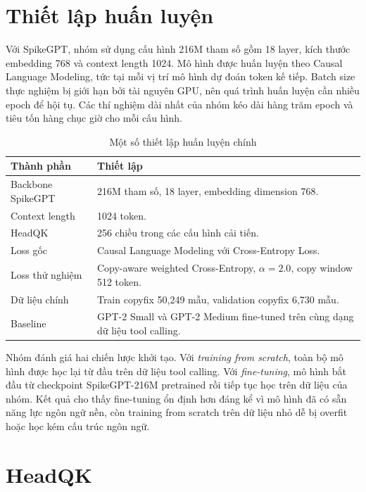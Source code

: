 \documentclass[12pt,a4paper,oneside]{report}
\newlength{\manualparindent}
\newcommand{\manualindent}{\hspace*{\manualparindent}}
\begin{document}
\section{Thiết lập huấn luyện}

\manualindent%
Với SpikeGPT, nhóm sử dụng cấu hình 216M tham số gồm 18 layer, kích thước embedding 768 và context length 1024. Mô hình được huấn luyện theo Causal Language Modeling, tức tại mỗi vị trí mô hình dự đoán token kế tiếp. Batch size thực nghiệm bị giới hạn bởi tài nguyên GPU, nên quá trình huấn luyện cần nhiều epoch để hội tụ. Các thí nghiệm dài nhất của nhóm kéo dài hàng trăm epoch và tiêu tốn hàng chục giờ cho mỗi cấu hình.

\begin{table}[H]
\centering
\caption{Một số thiết lập huấn luyện chính}
\begin{tabularx}{\textwidth}{p{4cm}X}
\toprule
\textbf{Thành phần} & \textbf{Thiết lập} \\
\midrule
Backbone SpikeGPT & 216M tham số, 18 layer, embedding dimension 768. \\
Context length & 1024 token. \\
HeadQK & 256 chiều trong các cấu hình cải tiến. \\
Loss gốc & Causal Language Modeling với Cross-Entropy Loss. \\
Loss thử nghiệm & Copy-aware weighted Cross-Entropy, \(\alpha=2.0\), copy window 512 token. \\
Dữ liệu chính & Train copyfix 50,249 mẫu, validation copyfix 6,730 mẫu. \\
Baseline & GPT-2 Small và GPT-2 Medium fine-tuned trên cùng dạng dữ liệu tool calling. \\
\bottomrule
\end{tabularx}
\end{table}

\manualindent%
Nhóm đánh giá hai chiến lược khởi tạo. Với \textit{training from scratch}, toàn bộ mô hình được học lại từ đầu trên dữ liệu tool calling. Với \textit{fine-tuning}, mô hình bắt đầu từ checkpoint SpikeGPT-216M pretrained rồi tiếp tục học trên dữ liệu của nhóm. Kết quả cho thấy fine-tuning ổn định hơn đáng kể vì mô hình đã có sẵn năng lực ngôn ngữ nền, còn training from scratch trên dữ liệu nhỏ dễ bị overfit hoặc học kém cấu trúc ngôn ngữ.

\section{HeadQK}
\end{document}
